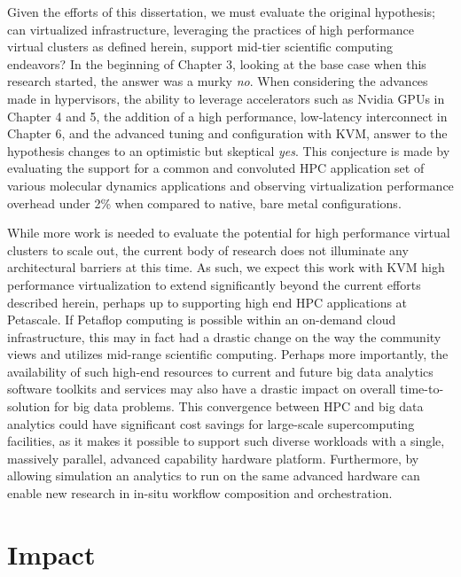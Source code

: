Given the efforts of this dissertation, we must evaluate the original hypothesis; can virtualized infrastructure, leveraging the practices of high performance virtual clusters as defined herein, support mid-tier scientific computing endeavors? In the beginning of Chapter 3, looking at the base case when this research started, the answer was a murky \emph{no}.  When considering the advances made in hypervisors, the ability to leverage accelerators such as Nvidia GPUs in Chapter 4 and 5, the addition of a high performance, low-latency interconnect in Chapter 6, and the advanced tuning and configuration with KVM, answer to the hypothesis changes to an optimistic but skeptical \emph{yes}.  This conjecture is made by evaluating the support for a common and convoluted HPC application set of various molecular dynamics applications and observing virtualization performance overhead under 2\% when compared to native, bare metal configurations.  

While more work is needed to evaluate the potential for high performance virtual clusters to scale out, the current body of research does not illuminate any architectural barriers at this time.  As such, we expect this work with KVM high performance virtualization to extend significantly beyond the current efforts described herein, perhaps up to supporting high end HPC applications at Petascale.  If Petaflop computing is possible within an on-demand cloud infrastructure, this may in fact had a drastic change on the way the community views and utilizes mid-range scientific computing. Perhaps more importantly, the availability of such high-end resources to current and future big data analytics software toolkits and services may also have a drastic impact on overall time-to-solution for big data problems. This convergence between HPC and big data analytics could have significant cost savings for large-scale supercomputing facilities, as it makes it possible to support such diverse workloads with a single, massively parallel, advanced capability hardware platform.  Furthermore, by allowing simulation an analytics to run on the same advanced hardware can enable new research in in-situ workflow composition and orchestration.





\section{Impact}
\label{sec:impact}


